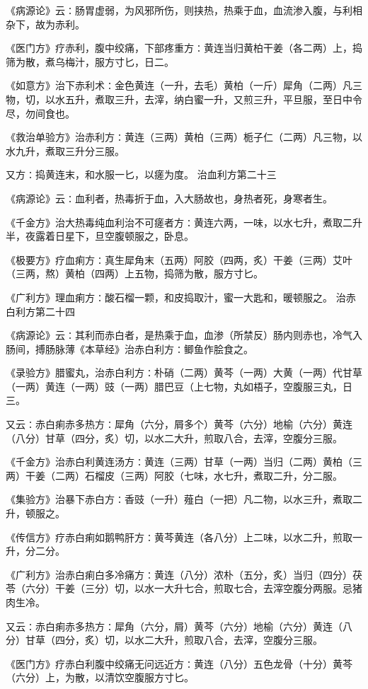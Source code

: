 \documentclass[a4paper,12pt,UTF8,twoside]{ctexbook}
\begin{document}
《病源论》云∶肠胃虚弱，为风邪所伤，则挟热，热乘于血，血流渗入腹，与利相杂下，故为赤利。

《医门方》疗赤利，腹中绞痛，下部疼重方∶黄连当归黄柏干姜（各二两）上，捣筛为散，煮乌梅汁，服方寸匕，日二。

《如意方》治下赤利术∶金色黄连（一升，去毛）黄柏（一斤）犀角（二两）凡三物，切，以水五升，煮取三升，去滓，纳白蜜一升，又煎三升，平旦服，至日中令尽，勿间食也。

《救治单验方》治赤利方∶黄连（三两）黄柏（三两）栀子仁（二两）凡三物，以水九升，煮取三升分三服。

又方∶捣黄连末，和水服一匕，以瘥为度。
治血利方第二十三

《病源论》云∶血利者，热毒折于血，入大肠故也，身热者死，身寒者生。

《千金方》治大热毒纯血利治不可瘥者方∶黄连六两，一味，以水七升，煮取二升半，夜露着日星下，旦空腹顿服之，卧息。

《极要方》疗血痢方∶真生犀角末（五两）阿胶（四两，炙）干姜（三两）艾叶（三两，熬）黄柏（四两）上五物，捣筛为散，服方寸匕。

《广利方》理血痢方∶酸石榴一颗，和皮捣取汁，蜜一大匙和，暖顿服之。
治赤白利方第二十四

《病源论》云∶其利而赤白者，是热乘于血，血渗（所禁反）肠内则赤也，冷气入肠间，搏肠脉薄《本草经》治赤白利方∶鲫鱼作脍食之。

《录验方》腊蜜丸，治赤白利方∶朴硝（二两）黄芩（一两）大黄（一两）代甘草（一两）黄连（一两）豉（一两）腊巴豆（上七物，丸如梧子，空腹服三丸，日三。

又云∶赤白痢赤多热方∶犀角（六分，屑多个）黄芩（六分）地榆（六分）黄连（八分）甘草（四分，炙）切，以水二大升，煎取八合，去滓，空腹分三服。

《千金方》治赤白利黄连汤方∶黄连（三两）甘草（一两）当归（二两）黄柏（三两）干姜（二两）石榴皮（三两）阿胶（七味，水七升，煮取二升，分二服。

《集验方》治暴下赤白方∶香豉（一升）薤白（一把）凡二物，以水三升，煮取二升，顿服之。

《传信方》疗赤白痢如鹅鸭肝方∶黄芩黄连（各八分）上二味，以水二升，煎取一升，分二分。

《广利方》治赤白痢白多冷痛方∶黄连（八分）浓朴（五分，炙）当归（四分）茯苓（六分）干姜（三分）切，以水一大升七合，煎取七合，去滓空腹分两服。忌猪肉生冷。

又云∶赤白痢赤多热方∶犀角（六分，屑）黄芩（六分）地榆（六分）黄连（八分）甘草（四分，炙）切，以水二大升，煎取八合，去滓，空腹分三服。

《医门方》疗赤白利腹中绞痛无问远近方∶黄连（八分）五色龙骨（十分）黄芩（六分）上，为散，以清饮空腹服方寸匕。
\end{document}
